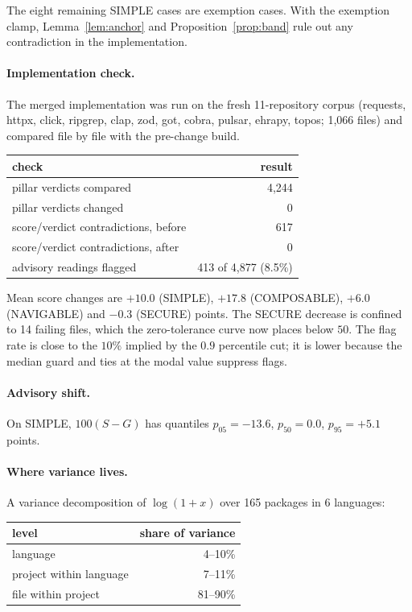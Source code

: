 \documentclass[11pt]{article}
\theoremstyle{remark}
\begin{document}
The eight remaining SIMPLE cases are exemption cases. With the exemption
clamp, Lemma~\ref{lem:anchor} and Proposition~\ref{prop:band} rule out any
contradiction in the implementation.

\paragraph{Implementation check.} The merged implementation was run on the
fresh 11-repository corpus (requests, httpx, click, ripgrep, clap, zod, got,
cobra, pulsar, ehrapy, topos; 1{,}066 files) and compared file by file with the
pre-change build.

\begin{center}
\begin{tabular}{lr}
\toprule
check & result \\
\midrule
pillar verdicts compared & 4{,}244 \\
pillar verdicts changed & 0 \\
score/verdict contradictions, before & 617 \\
score/verdict contradictions, after & 0 \\
advisory readings flagged & 413 of 4{,}877 (8.5\%) \\
\bottomrule
\end{tabular}
\end{center}

Mean score changes are $+10.0$ (SIMPLE), $+17.8$ (COMPOSABLE), $+6.0$
(NAVIGABLE) and $-0.3$ (SECURE) points. The SECURE decrease is confined to 14
failing files, which the zero-tolerance curve now places below $50$. The flag
rate is close to the $10\%$ implied by the $0.9$ percentile cut; it is lower
because the median guard and ties at the modal value suppress flags.

\paragraph{Advisory shift.} On SIMPLE, $100(S - G)$ has quantiles
$p_{05} = -13.6$, $p_{50} = 0.0$, $p_{95} = +5.1$ points.

\paragraph{Where variance lives.} A variance decomposition of $\log(1 + x)$
over 165 packages in 6 languages:

\begin{center}
\begin{tabular}{lr}
\toprule
level & share of variance \\
\midrule
language & 4--10\% \\
project within language & 7--11\% \\
file within project & 81--90\% \\
\bottomrule
\end{tabular}
\end{center}
\end{document}
